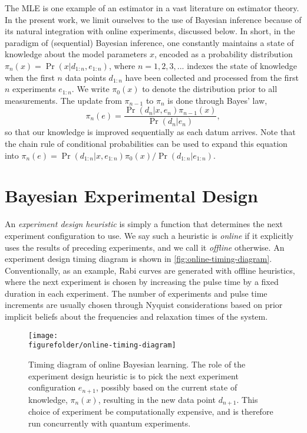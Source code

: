 \documentclass[aps,nofootinbib,twocolumn,superscriptaddress]{revtex4}
\newcommand{\figurefolder}{../fig}
\newcommand{\mps}{x}
\newcommand{\eps}{e}
\newcommand{\data}{d}
\begin{document}
The MLE is one example of an estimator in a vast literature on estimator theory.
In the present work, we limit ourselves to the use of Bayesian inference because of its
natural integration with online experiments, discussed below.
In short, in the paradigm of (sequential) Bayesian inference, one constantly
maintains a state of knowledge about the model parameters $\mps$, encoded
as a probability distribution $\pi_n(\mps)=\Pr(\mps|\data_{1:n},\eps_{1:n})$,
where $n=1,2,3,...$ indexes the state of knowledge when the first $n$ data
points $\data_{1:n}$ have been collected and processed from the
first $n$ experiments $\eps_{1:n}$.
We write $\pi_0(x)$ to denote the distribution prior to all measurements.
The update from $\pi_{n-1}$ to $\pi_n$ is done through Bayes' law,
\begin{equation}
    \pi_n(\eps)
        = \frac{
            \Pr(\data_n|\mps,\eps_n)\pi_{n-1}(\mps)
        }{
            \Pr(\data_n|\eps_n)
        },
\end{equation}
so that our knowledge is improved sequentially as each datum arrives.
Note that the chain rule of conditional probabilities can be used to expand
this equation into
$\pi_n(\eps)=\Pr(\data_{1:n}|\mps,\eps_{1:n})\pi_0(\mps)/\Pr(\data_{1:n}|\eps_{1:n})$.

\section{Bayesian Experimental Design}
\label{sec:experimental-design}

An \textit{experiment design heuristic} is simply a function that
determines the next experiment configuration to use.
We say such a heuristic is \textit{online} if it explicitly uses the
results of preceding experiments, and we call it \textit{offline}
otherwise.
An experiment design timing diagram is shown in \autoref{fig:online-timing-diagram}.
Conventionally, as an example, Rabi curves are generated
with offline heuristics, where the next experiment is chosen by
increasing the pulse time by a fixed duration in each experiment.
The number of experiments and pulse time increments are usually
chosen through Nyquist considerations based on prior implicit
beliefs about the frequencies and relaxation times of the system.

\begin{figure*}
    \texttt{[image: \\figurefolder/online-timing-diagram]}
    \caption{Timing diagram of online Bayesian learning. The role of the
    experiment design heuristic is to pick the next experiment configuration
    $e_{n+1}$, possibly based
    on the current state of knowledge, $\pi_n(\mps)$, resulting in the
    new data point $d_{n+1}$.
    This choice of experiment be computationally expensive, and is
    therefore run concurrently with quantum experiments.}
    \label{fig:online-timing-diagram}
\end{figure*}
\end{document}
